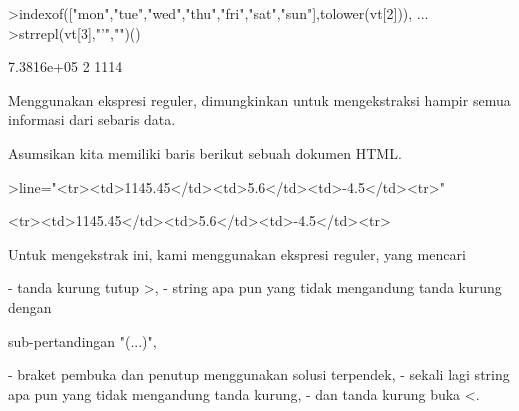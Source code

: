 \documentclass[a4paper,10pt]{article}
\begin{document}
\begin{eulernotebook}
\begin{eulercomment}
\begin{eulercomment}
\begin{eulercomment}
\begin{eulercomment}
\begin{eulercomment}
\begin{eulercomment}
\begin{eulercomment}
\begin{eulercomment}
\begin{eulercomment}
\begin{eulercomment}
\begin{eulercomment}
\begin{eulercomment}
\begin{eulercomment}
\begin{eulercomment}
\begin{eulercomment}
\begin{eulercomment}
\begin{eulercomment}
\begin{eulercomment}
\begin{eulerprompt}
>indexof(["mon","tue","wed","thu","fri","sat","sun"],tolower(vt[2])),  ...
>strrepl(vt[3],"'","")()
\end{eulerprompt}
\begin{euleroutput}
  7.3816e+05
  2
  1114
\end{euleroutput}
\begin{eulercomment}
Menggunakan ekspresi reguler, dimungkinkan untuk mengekstraksi hampir
semua informasi dari sebaris data.

Asumsikan kita memiliki baris berikut sebuah dokumen HTML.
\end{eulercomment}
\begin{eulerprompt}
>line="<tr><td>1145.45</td><td>5.6</td><td>-4.5</td><tr>"
\end{eulerprompt}
\begin{euleroutput}
  <tr><td>1145.45</td><td>5.6</td><td>-4.5</td><tr>
\end{euleroutput}
\begin{eulercomment}
Untuk mengekstrak ini, kami menggunakan ekspresi reguler, yang mencari

\end{eulercomment}
\begin{eulerttcomment}
 - tanda kurung tutup >,
 - string apa pun yang tidak mengandung tanda kurung dengan
\end{eulerttcomment}
\begin{eulercomment}
sub-pertandingan "(...)",\\
\end{eulercomment}
\begin{eulerttcomment}
 - braket pembuka dan penutup menggunakan solusi terpendek,
 - sekali lagi string apa pun yang tidak mengandung tanda kurung,
 - dan tanda kurung buka <.
\end{eulerttcomment}
\begin{eulercomment}


\end{eulercomment}
\end{eulercomment}
\end{eulercomment}
\end{eulercomment}
\end{eulercomment}
\end{eulercomment}
\end{eulercomment}
\end{eulercomment}
\end{eulercomment}
\end{eulercomment}
\end{eulercomment}
\end{eulercomment}
\end{eulercomment}
\end{eulercomment}
\end{eulercomment}
\end{eulercomment}
\end{eulercomment}
\end{eulercomment}
\end{eulercomment}
\end{eulernotebook}
\end{document}
